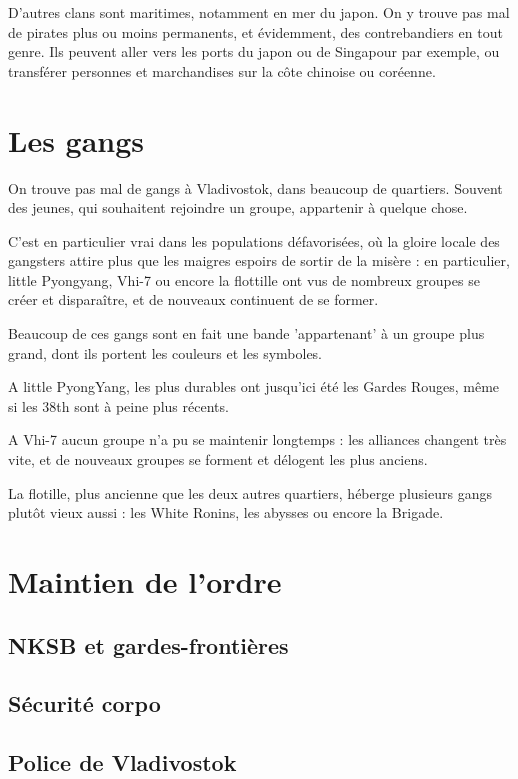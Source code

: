 \documentclass[10pt,a4paper]{book}
\begin{document}
D'autres clans sont maritimes, notamment en mer du japon. On y trouve pas mal de pirates plus ou moins permanents, et évidemment, des contrebandiers en tout genre. Ils peuvent aller vers les ports du japon ou de Singapour par exemple, ou transférer personnes et marchandises sur la côte chinoise ou coréenne.
\section{Les gangs}
On trouve pas mal de gangs à Vladivostok, dans beaucoup de quartiers. Souvent des jeunes, qui souhaitent rejoindre un groupe, appartenir à quelque chose.

C'est en particulier vrai dans les populations défavorisées, où la gloire locale des gangsters attire plus que les maigres espoirs de sortir de la misère : en particulier, little Pyongyang, Vhi-7 ou encore la flottille ont vus de nombreux groupes se créer et disparaître, et de nouveaux continuent de se former.

Beaucoup de ces gangs sont en fait une bande 'appartenant' à un groupe plus grand, dont ils portent les couleurs et les symboles.

A little PyongYang, les plus durables ont jusqu'ici été les Gardes Rouges, même si les 38th sont à peine plus récents.

A Vhi-7 aucun groupe n'a pu se maintenir longtemps : les alliances changent très vite, et de nouveaux groupes se forment et délogent les plus anciens.

La flotille, plus ancienne que les deux autres quartiers, héberge plusieurs gangs plutôt vieux aussi : les White Ronins, les abysses ou encore la Brigade. 
\section{Maintien de l'ordre}
\subsection{NKSB et gardes-frontières}
\subsection{Sécurité corpo}
\subsection{Police de Vladivostok}
\end{document}
